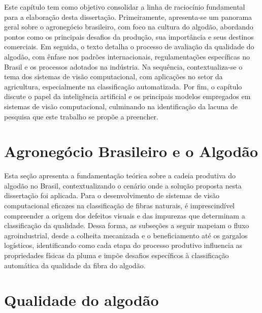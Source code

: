 Este capítulo tem como objetivo consolidar a linha de raciocínio fundamental para a elaboração desta dissertação. Primeiramente, apresenta-se um panorama geral sobre o agronegócio brasileiro, com foco na cultura do algodão, abordando pontos como os principais desafios da produção, sua importância e seus destinos comerciais. Em seguida, o texto detalha o processo de avaliação da qualidade do algodão, com ênfase nos padrões internacionais, regulamentações específicas no Brasil e os processos adotados na indústria. Na sequência, contextualiza-se o tema dos sistemas de visão computacional, com aplicações no setor da agricultura, especialmente na classificação automatizada. Por fim, o capítulo discute o papel da inteligência artificial e  os principais modelos empregados em sistemas de visão computacional, culminando na identificação da lacuna de pesquisa que este trabalho se propõe a preencher.

\section{Agronegócio Brasileiro e o Algodão}
\label{sec:agro_brasileiro_algodao}

Esta seção apresenta a fundamentação teórica sobre a cadeia produtiva do algodão no Brasil, contextualizando o cenário onde a solução proposta nesta dissertação foi aplicada. Para o desenvolvimento de sistemas de visão computacional eficazes na classificação de fibras naturais, é imprescindível compreender a origem dos defeitos visuais e das impurezas que determinam a classificação da qualidade. Dessa forma, as subseções a seguir mapeiam o fluxo agroindustrial, desde a colheita mecanizada e o beneficiamento até os gargalos logísticos, identificando como cada etapa do processo produtivo influencia as propriedades físicas da pluma e impõe desafios específicos à classificação automática da qualidade da fibra do algodão.



\section{Qualidade do algodão}
\label{sec:qualidade}


